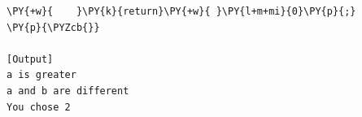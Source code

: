 \begin{Verbatim}[label=\makebox{\url{https://github.com/lucabaldini/cmepda/tree/master/slides/latex/snippets/control_flow.c}},commandchars=\\\{\}]
\PY{+w}{    }\PY{k}{return}\PY{+w}{ }\PY{l+m+mi}{0}\PY{p}{;}
\PY{p}{\PYZcb{}}

[Output]
a is greater
a and b are different
You chose 2
\end{Verbatim}